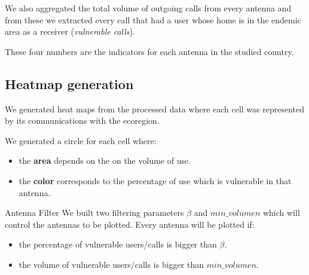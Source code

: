     We also aggregated the total volume of outgoing calls from every antenna and from these we extracted every call that had a user whose home is in the endemic area as a receiver (\textit{vulnerable calls}).
    
    These four numbers are the indicators for each antenna in the studied country.
\subsection{Heatmap generation}

		We generated heat maps from the processed data where each cell was represented by its communications with
		the ecoregion.
		
		We generated a circle for each cell where:
		\begin{itemize}
			\item the \textbf{area} depends on the on the volume of use.
			\item the \textbf{color} corresponds to the percentage of use which is vulnerable in that antenna.
		\end{itemize}
		
		\begin{block}{Antenna Filter}
		We built two filtering parameters $\beta$ and $min\_volumen$ which will control the antennas to be plotted.
		Every antenna will be plotted if:
		\begin{itemize}
			\item the percentage of vulnerable users/calls is bigger than  $\beta$.
			\item the volume of vulnerable users/calls is bigger than $min\_volumen$. 
		\end{itemize}
		
		
		
	\end{block}